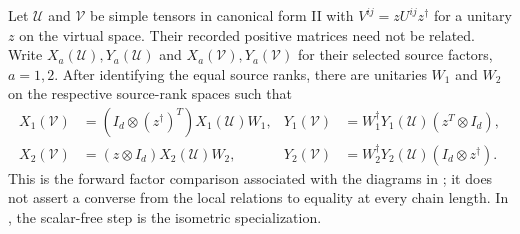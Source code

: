 \begin{lemma}
    \label{thm:mpu_source_factors_virtual_unitary_gauge}
    \leanok
    Let $\mathcal U$ and $\mathcal V$ be simple tensors in canonical form II
    with $V^{ij}=zU^{ij}z^\dagger$ for a unitary $z$ on the virtual space.
    Their recorded positive matrices need not be related. Write
    $X_a(\mathcal U),Y_a(\mathcal U)$ and
    $X_a(\mathcal V),Y_a(\mathcal V)$ for their selected source factors,
    $a=1,2$. After identifying the equal source ranks, there are unitaries
    $W_1$ and $W_2$ on the respective source-rank spaces such that
    \begin{align}
        X_1(\mathcal V)
         & =(I_d\otimes(z^\dagger)^T)X_1(\mathcal U)W_1,
         & Y_1(\mathcal V)
         & =W_1^\dagger Y_1(\mathcal U)(z^T\otimes I_d),       \\
        X_2(\mathcal V)
         & =(z\otimes I_d)X_2(\mathcal U)W_2,
         & Y_2(\mathcal V)
         & =W_2^\dagger Y_2(\mathcal U)(I_d\otimes z^\dagger).
    \end{align}
    This is the forward factor
    comparison associated with the diagrams in
    \cite[lines~624--648]{Cirac2017MPU}; it does not assert
    a converse from the local relations to equality at every chain length.
    In \cite[lines~1052--1066]{FrancoRubio2025MPUGauging}, the scalar-free step is the isometric
    specialization.
\end{lemma}


